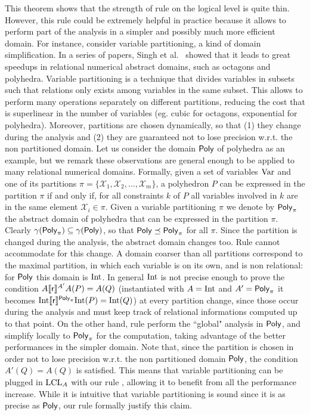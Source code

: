 This theorem shows that the strength of rule  on the logical level is quite thin.
However, this rule could be extremely helpful in practice because it allows to perform part of the analysis in a simpler and possibly much more efficient domain.
For instance, consider variable partitioning, a kind of domain simplification. In a series of papers, Singh et al.~\cite{SPV15,SPV17,SPV18} showed that it leads to great speedups in relational numerical abstract domains, such as octagons and polyhedra. Variable partitioning is a technique that divides variables in subsets such that relations only exists among variables in the same subset. This allows to perform many operations separately on different partitions, reducing the cost that is superlinear in the number of variables (eg. cubic for octagons, exponential for polyhedra). Moreover, partitions are chosen dynamically, so that (1) they change during the analysis and (2) they are guaranteed not to lose precision w.r.t. the non partitioned domain.
Let us consider the domain $\mathsf{Poly}$ of polyhedra as an example, but we remark these observations are general enough to be applied to many relational numerical domains.
Formally, given a set of variables $\text{Var}$ and one of its partitions $\pi = \{ \mathcal{X}_1, \mathcal{X}_2, \dots, \mathcal{X}_m \}$, a polyhedron $P$ can be expressed in the partition $\pi$ if and only if, for all constraints $k$ of $P$ all variables involved in $k$ are in the same element $\mathcal{X}_i \in \pi$.
Given a variable partitioning $\pi$ we denote by $\mathsf{Poly}_{\pi}$ the abstract domain of polyhedra that can be expressed in the partition $\pi$. Clearly $\gamma(\mathsf{Poly}_{\pi}) \subseteq \gamma(\mathsf{Poly})$, so that $\mathsf{Poly} \preceq \mathsf{Poly}_{\pi}$ for all $\pi$.
Since the partition is changed during the analysis, the abstract domain changes too. Rule  cannot accommodate for this change. A domain coarser than all partitions correspond to the maximal partition, in which each variable is on its own, and is non relational: for $\mathsf{Poly}$ this domain is $\text{Int}$. In general $\text{Int}$ is not precise enough to prove the condition $A \llbracket\mathsf{r}\rrbracket^{A'} A(P) = A(Q)$ (instantiated with $A = \text{Int}$ and $A' = \mathsf{Poly}_{\pi}$ it becomes $\text{Int} \llbracket\mathsf{r}\rrbracket^{\mathsf{Poly}_{\pi}} \text{Int}(P) = \text{Int}(Q)$) at every partition change, since those occur during the analysis and must keep track of relational informations computed up to that point.
On the other hand, rule  perform the ``global" analysis in $\mathsf{Poly}$, and simplify locally to $\mathsf{Poly}_{\pi}$ for the computation, taking advantage of the better performances in the simpler domain. Note that, since the partition is chosen in order not to lose precision w.r.t. the non partitioned domain $\mathsf{Poly}$, the condition $A'(Q) = A(Q)$ is satisfied. This means that variable partitioning can be plugged in $\text{LCL}_A$ with our rule , allowing it to benefit from all the performance increase. While it is intuitive that variable partitioning is sound since it is as precise as $\mathsf{Poly}$, our rule formally justify this claim.

